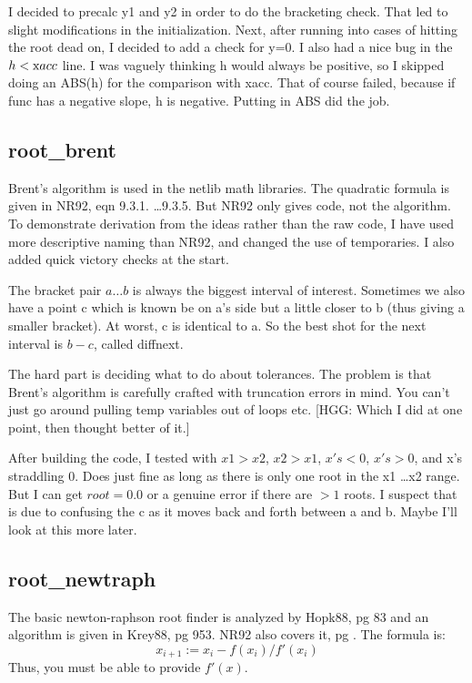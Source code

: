 I decided to precalc y1 and y2 in order to do the bracketing
check.  That led to slight modifications in the
initialization.  Next, after running into cases of hitting
the root dead on, I decided to add a check for y=0.  I also
had a nice bug in the $h < {\mbox xacc}$ line.  I was vaguely thinking h
would always be positive, so I skipped doing an ABS(h) for
the comparison with xacc.  That of course failed, because if
func has a negative slope, h is negative.  Putting in ABS
did the job.


\subsection*{root\_brent}
Brent's algorithm is used in the netlib math libraries.
The quadratic formula is given in NR92, eqn 9.3.1. \dots 9.3.5.
But NR92 only gives code, not the algorithm.  To demonstrate
derivation from the ideas rather than the raw code, I have
used more descriptive naming than NR92, and changed the use
of temporaries.  I also added quick victory checks at the
start.

The bracket pair $a \dots b$ is always the biggest interval of
interest.  Sometimes we also have a point c which is known
be on a's side but a little closer to b (thus giving a
smaller bracket).  At worst, c is identical to a.  So the
best shot for the next interval is $b-c$, called diffnext.

The hard part is deciding what to do about tolerances.  The
problem is that Brent's algorithm is carefully crafted with
truncation errors in mind.  You can't just go around pulling
temp variables out of loops etc. [HGG: Which I did at one point,
then thought better of it.]

After building the code, I tested with $x1>x2$, $x2>x1$, $x's <0$,
$x's > 0$, and x's straddling 0.  Does just fine as long as
there is only one root in the x1 \dots x2 range.  But I can get
$root=0.0$ or a genuine error if there are $>1$ roots.  I
suspect that is due to confusing the c as it moves back and
forth between a and b.  Maybe I'll look at this more later.


\subsection*{root\_newtraph}
The basic newton-raphson root finder is analyzed by Hopk88,
pg 83 and an algorithm is given in Krey88, pg 953.  NR92
also covers it, pg .  The formula is:
\begin{equation}    
  x_{i+1}:=x_i-f(x_i)/f'(x_i)
\end{equation}
Thus, you must be able to provide $f'(x)$.


